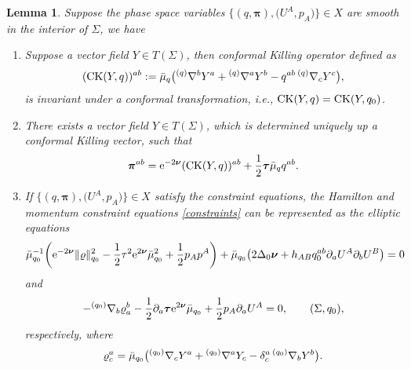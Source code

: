 \documentclass[11pt]{article}
\numberwithin{equation}{section}
\def\ptl{\partial}%
\def\mbo#1{\boldsymbol{#1}}%
\def\grad{{\nabla}}%
\newcommand{\leftexp}[2]{{\vphantom{#2}}^{#1}{#2}}
\def\halb{\frac{1}{2}}%
\numberwithin{equation}{section}
\newtheorem{Lemma}[Theorem]{Lemma}
\begin{document}
\begin{Lemma}
Suppose the phase space variables $ \bigl\{ (q, \mbo{\pi}), \bigl(U^A, p_A\bigr) \bigr\} \in X$ are smooth in the interior of $\Sigma$, we have
\begin{enumerate}\itemsep=0pt
\item[$(1)$] Suppose a vector field $Y \in T (\Sigma)$, then conformal Killing operator defined as
\begin{align*}
({\rm CK}(Y, q))^{ab}:= \bar{\mu}_q \bigl(\leftexp{(q)}{\grad}^b Y^a + \leftexp{(q)}{\grad}^a Y^b - q^{ab} \, \leftexp{(q)}{\grad}_c Y^c\bigr),
\end{align*}
is invariant under a conformal transformation, i.e., ${\rm CK} (Y,q) = {\rm CK}(Y, q_0)$.
\item[$(2)$] There exists a vector field $Y \in T(\Sigma)$, which is determined uniquely up a conformal Killing vector, such that
\begin{align*}
\mbo{\pi}^{ab}= {\rm e}^{-2 \mbo{\nu}} ({\rm CK}(Y, q))^{ab} + \halb \mbo{\tau} \bar{\mu}_q q^{ab}.
\end{align*}
\item[$(3)$] If $ \bigl\{ (q, \mbo{\pi}), \bigl(U^A, p_A\bigr) \bigr\} \in X$ satisfy the constraint equations, the Hamilton and momentum constraint equations \eqref{constraints} can be represented as the elliptic equations
\begin{align*}
\bar{\mu}^{-1}_{q_0} \biggl({\rm e}^{-2 \mbo{\nu}} \Vert \varrho \Vert^2_{q_0} - \halb \tau^2 {\rm e}^{2 \mbo{\nu}} \bar{\mu}^2_{q_0} + \halb p_A p^A\biggr)
+ \bar{\mu}_{q_0} \bigl(2 \Delta_0 \mbo{\nu} + h_{AB} q_0^{ab} \ptl_a U^A \ptl_b U^B\bigr) =0
\end{align*}
and
\[
-\leftexp{(q_0)}{\grad}_b \varrho^b_a - \halb \ptl_a \mbo{\tau} {\rm e}^{2 \mbo{\nu}} \bar{\mu}_{q_0} + \halb p_A \ptl_a U^A=0, \qquad (\Sigma, q_0),
\]
respectively, where
\begin{align}\label{varrho-def}
\varrho^a_c= \bar{\mu}_{q_0} \bigl(\leftexp{(q_0)}{\grad}_c Y^a + \leftexp{(q_0)}{\grad}^a Y_c - \delta^a_c \, \leftexp{(q_0)}{\grad}_b Y^b\bigr).
\end{align}
\end{enumerate}
\end{Lemma}
\end{document}
